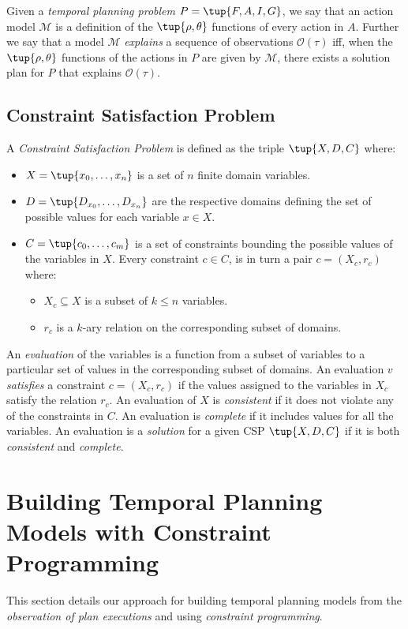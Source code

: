 \documentclass[runningheads]{llncs}
\begin{document}
Given a {\em temporal planning problem} $P=\tup{F,A,I,G}$, we say that an action model $\mathcal{M}$ is a definition of the $\tup{\rho,\theta}$ functions of every action in $A$. Further we say that a model $\mathcal{M}$ {\em explains} a sequence of observations $\mathcal{O}(\tau)$ iff, when the $\tup{\rho,\theta}$ functions of the actions in $P$ are given by $\mathcal{M}$, there exists a solution plan for $P$ that explains $\mathcal{O}(\tau)$.


\subsection{Constraint Satisfaction Problem}
A {\em Constraint Satisfaction Problem} is defined as the triple $\tup{X,D,C}$ where:
\begin{itemize}
\item $X=\tup{x_0, \ldots, x_n}$ is a set of $n$ finite domain variables.
\item $D=\tup{D_{x_0}, \ldots, D_{x_n}}$ are the respective domains defining the set of possible values for each variable $x\in X$.
\item $C=\tup{c_0, \ldots, c_m}$ is a set of constraints bounding the possible values of the variables in $X$. Every constraint $c\in C$, is in turn a pair $c=(X_c,r_c)$ where:
\begin{itemize}
\item $X_c\subseteq X$ is a subset of $k\leq n$ variables.
\item $r_c$ is a $k$-ary relation on the corresponding subset of domains.
\end{itemize}
\end{itemize}

An {\em evaluation} of the variables is a function from a subset of variables to a particular set of values in the corresponding subset of domains. An evaluation $v$ {\em satisfies} a constraint $c=(X_c,r_c)$ if the values assigned to the variables in $X_c$ satisfy the relation $r_c$. An evaluation of $X$ is {\em consistent} if it does not violate any of the constraints in $C$. An evaluation is {\em complete} if it includes values for all the variables. An evaluation is a {\em solution} for a given CSP $\tup{X,D,C}$ if it is both {\em consistent} and {\em complete}.

\section{Building Temporal Planning Models with Constraint Programming}
\label{sec:learning}
This section details our approach for building temporal planning models from the {\em observation of plan executions} and using {\em constraint programming}.
\end{document}
